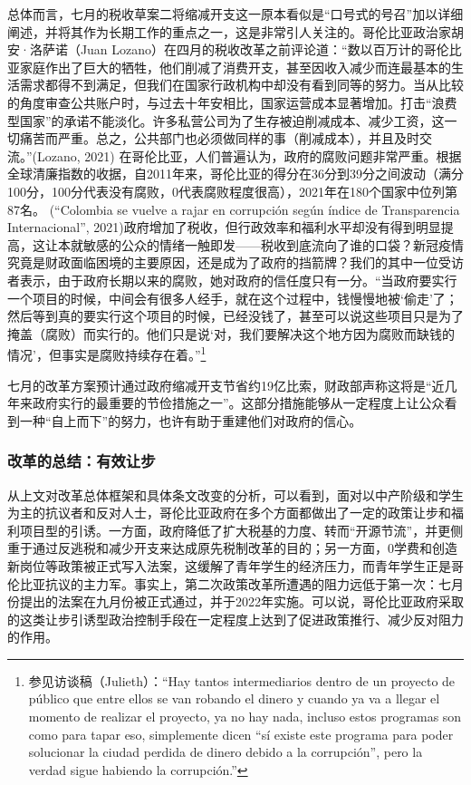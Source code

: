 \documentclass{phyasgn}\usepackage{nag}
\begin{document}
\par 总体而言，七月的税收草案二将缩减开支这一原本看似是“口号式的号召”加以详细阐述，并将其作为长期工作的重点之一，这是非常引人关注的。哥伦比亚政治家胡安·洛萨诺（Juan Lozano）在四月的税收改革之前评论道：“数以百万计的哥伦比亚家庭作出了巨大的牺牲，他们削减了消费开支，甚至因收入减少而连最基本的生活需求都得不到满足，但我们在国家行政机构中却没有看到同等的努力。当从比较的角度审查公共账户时，与过去十年安相比，国家运营成本显著增加。打击“浪费型国家”的承诺不能淡化。许多私营公司为了生存被迫削减成本、减少工资，这一切痛苦而严重。总之，公共部门也必须做同样的事（削减成本），并且及时交流。”(Lozano, 2021) 在哥伦比亚，人们普遍认为，政府的腐败问题非常严重。根据全球清廉指数的收据，自2011年来，哥伦比亚的得分在36分到39分之间波动（满分100分，100分代表没有腐败，0代表腐败程度很高），2021年在180个国家中位列第87名。 (“Colombia se vuelve a rajar en corrupción según índice de Transparencia Internacional”, 2021)政府增加了税收，但行政效率和福利水平却没有得到明显提高，这让本就敏感的公众的情绪一触即发——税收到底流向了谁的口袋？新冠疫情究竟是财政面临困境的主要原因，还是成为了政府的挡箭牌？我们的其中一位受访者表示，由于政府长期以来的腐败，她对政府的信任度只有一分。“当政府要实行一个项目的时候，中间会有很多人经手，就在这个过程中，钱慢慢地被‘偷走’了；然后等到真的要实行这个项目的时候，已经没钱了，甚至可以说这些项目只是为了掩盖（腐败）而实行的。他们只是说‘对，我们要解决这个地方因为腐败而缺钱的情况’，但事实是腐败持续存在着。”\footnote[38]{参见访谈稿（Julieth）：“Hay tantos intermediarios dentro de un proyecto de público que entre ellos se van robando el dinero y cuando ya va a llegar el momento de realizar el proyecto, ya no hay nada, incluso estos programas son como para tapar eso, simplemente dicen “sí existe este programa para poder solucionar la ciudad perdida de dinero debido a la corrupción”, pero la verdad sigue habiendo la corrupción.”}
\par 七月的改革方案预计通过政府缩减开支节省约19亿比索，财政部声称这将是“近几年来政府实行的最重要的节俭措施之一”。这部分措施能够从一定程度上让公众看到一种“自上而下”的努力，也许有助于重建他们对政府的信心。
\subsubsection{改革的总结：有效让步}
从上文对改革总体框架和具体条文改变的分析，可以看到，面对以中产阶级和学生为主的抗议者和反对人士，哥伦比亚政府在多个方面都做出了一定的政策让步和福利项目型的引诱。一方面，政府降低了扩大税基的力度、转而“开源节流”，并更侧重于通过反逃税和减少开支来达成原先税制改革的目的；另一方面，0学费和创造新岗位等政策被正式写入法案，这缓解了青年学生的经济压力，而青年学生正是哥伦比亚抗议的主力军。事实上，第二次政策改革所遭遇的阻力远低于第一次：七月份提出的法案在九月份被正式通过，并于2022年实施。可以说，哥伦比亚政府采取的这类让步引诱型政治控制手段在一定程度上达到了促进政策推行、减少反对阻力的作用。
\end{document}
